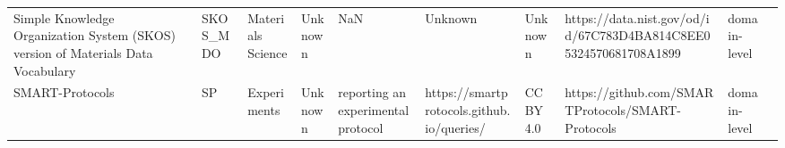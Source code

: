 \begin{tabular}{llllllllll}
Simple Knowledge Organization System (SKOS) version of Materials Data Vocabulary  &                SKOS_MDO &                           Materials Science &                                                                                                                                                                                                                                                                                                                                                              Unknown &                                                                                                                                                                                                                                                                                                                                                                                                    NaN &                                                                                                            Unknown &                                      Unknown &                                   https://data.nist.gov/od/id/67C783D4BA814C8EE05324570681708A1899 &      domain-level \\
                                                                  SMART-Protocols &                      SP &                                 Experiments &                                                                                                                                                                                                                                                                                                                                                              Unknown &                                                                                                                                                                                                                                                                                                                                                                     reporting an experimental protocol &                                                                          https://smartprotocols.github.io/queries/ &                                    CC BY 4.0 &                                                  https://github.com/SMARTProtocols/SMART-Protocols &      domain-level \\

\end{tabular}

